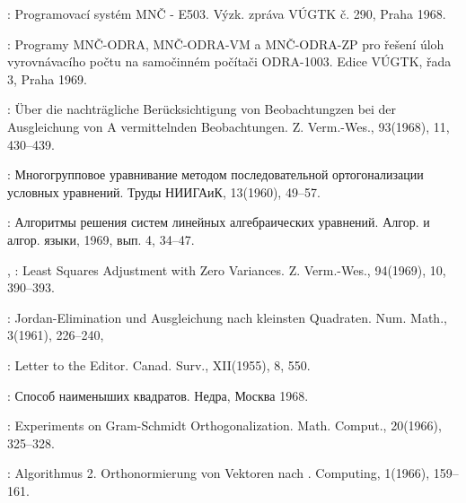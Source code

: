 \begin{enumerate}[label={[\arabic*]}]
\item {}: Programovací systém MNČ - E503. Výzk. zpráva
  VÚGTK č. 290, Praha 1968.


\item {}: Programy MNČ-ODRA, MNČ-ODRA-VM a MNČ-ODRA-ZP
  pro řešení úloh vyrovnávacího počtu na samočinném počítači
  ODRA-1003. Edice VÚGTK, řada 3, Praha 1969.

\item {}: Über die nachträgliche Berücksichtigung von
  Beobachtungzen bei der Ausgleichung von A vermittelnden
  Beobachtungen. Z. Verm.-Wes., 93(1968), 11, 430--439.

\item {}: Многогрупповое уравнивание методом
  последовательной ортогонализации условных уравнений. Труды НИИГАиК,
  13(1960), 49--57.

\item {}: Алгоритмы решения систем линейных
  алгебраических уравнений. Алгор. и алгор. языки, 1969, вып. 4,
  34--47.


\item {}, :  Least Squares
  Adjustment with Zero Variances. Z. Verm.-Wes., 94(1969), 10,
  390--393.

\item {}: Jordan-Elimination und Ausgleichung nach kleinsten
  Quadraten. Num. Math., 3(1961), 226--240,

\item {}: Letter to the Editor. Canad. Surv., XII(1955),
  8, 550.

\item {}: Способ наименыших квадратов. Недра,
  Москва 1968.

\item {}: Experiments on Gram-Schmidt Orthogonalization.
  Math. Comput., 20(1966), 325--328.

\item {}: Algorithmus 2. Orthonormierung von
  Vektoren nach . Computing, 1(1966), 159--161.


\end{enumerate}
